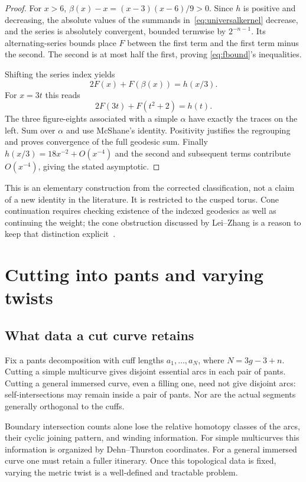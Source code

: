 \documentclass[11pt,a4paper]{article}
\numberwithin{equation}{section}
\theoremstyle{definition}
\theoremstyle{remark}
\begin{document}
\begin{proof}
For $x>6$,
$\beta(x)-x=(x-3)(x-6)/9>0$. Since $h$ is positive and decreasing,
the absolute values of the summands in~\eqref{eq:universalkernel} decrease,
and the series is absolutely convergent, bounded termwise by $2^{-n-1}$.
Its alternating-series bounds place $F$ between the first term and the
first term minus the second. The second is at most half the first, proving
\eqref{eq:fbound}'s inequalities.

Shifting the series index yields
\[
 2F(x)+F(\beta(x))=h(x/3).
\]
For $x=3t$ this reads
\begin{equation}
 2F(3t)+F(t^2+2)=h(t).
 \label{eq:kernelrelation}
\end{equation}
The three figure-eights associated with a simple $\alpha$ have exactly
the traces on the left. Sum over $\alpha$ and use McShane's identity.
Positivity justifies the regrouping and proves convergence of the full
geodesic sum. Finally $h(x/3)=18x^{-2}+O(x^{-4})$ and the second and
subsequent terms contribute $O(x^{-4})$, giving the stated asymptotic.
\end{proof}

This is an elementary construction from the corrected classification,
not a claim of a new identity in the literature. It is restricted to the
cusped torus. Cone continuation requires checking existence of the indexed
geodesics as well as continuing the weight; the cone obstruction discussed
by Lei--Zhang is a reason to keep that distinction explicit~\cite{LeiZhang}.

\section{Cutting into pants and varying twists}
\label{sec:twists}

\subsection{What data a cut curve retains}

Fix a pants decomposition with cuff lengths $a_1,\ldots,a_N$, where
$N=3g-3+n$. Cutting a simple multicurve gives disjoint essential arcs in
each pair of pants. Cutting a general immersed curve, even a filling one,
need not give disjoint arcs: self-intersections may remain inside a pair
of pants. Nor are the actual segments generally orthogonal to the cuffs.

Boundary intersection counts alone lose the relative homotopy classes of
the arcs, their cyclic joining pattern, and winding information. For simple
multicurves this information is organized by Dehn--Thurston coordinates.
For a general immersed curve one must retain a fuller itinerary. Once this
topological data is fixed, varying the metric twist is a well-defined and
tractable problem.
\end{document}
